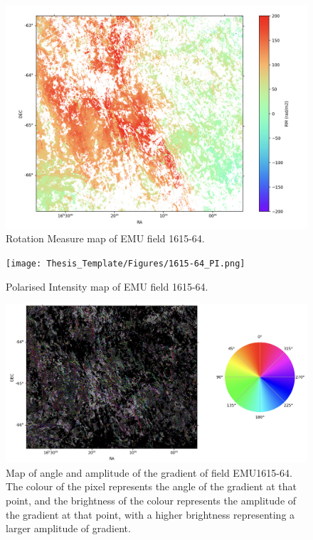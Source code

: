 \begin{figure}
    \centering
    \includegraphics[width=1\linewidth]{Thesis_Template/Figures/1615-64_RM.png}
    \caption{Rotation Measure map of EMU field 1615-64.}
    \label{fig:1615-64 rm}
\end{figure}

\begin{figure}
    \centering
    \texttt{[image: Thesis\_Template/Figures/1615-64\_PI.png]}
    \caption{Polarised Intensity map of EMU field 1615-64.}
    \label{fig:1615-64 pi}
\end{figure}

\begin{figure}
    \centering
    \includegraphics[width=\linewidth]{Thesis_Template/Figures/Hue_3.png}
    \caption{Map of angle and amplitude of the gradient of field EMU1615-64. The colour of the pixel represents the angle of the gradient at that point, and the brightness of the colour represents the amplitude of the gradient at that point, with a higher brightness representing a larger amplitude of gradient. }
    \label{fig:hue}
\end{figure}

